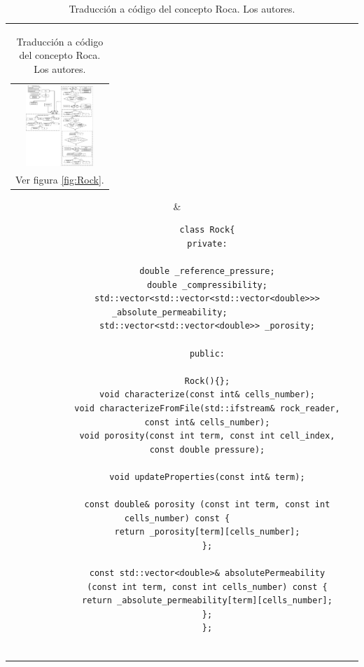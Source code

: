 \begin{table}[h]
	\centering
	\begin{tabular}{cc}
		\parbox[c]{1em}{
			\begin{tabular}[c]{@{}c@{}}\includegraphics[width=1in]{Fig/Rock.pdf}\\ Ver figura \ref{fig:Rock}.\end{tabular}
		}
		&
		\begin{tiny}
			\begin{lstlisting}
			class Rock{
			private:
			
			double _reference_pressure;
			double _compressibility;
			std::vector<std::vector<std::vector<double>>> _absolute_permeability;   
			std::vector<std::vector<double>> _porosity;
			
			public:
			
			Rock(){};
			void characterize(const int& cells_number);
			void characterizeFromFile(std::ifstream& rock_reader,
			const int& cells_number);
			void porosity(const int term, const int cell_index,
			const double pressure);
			
			void updateProperties(const int& term);
			
			const double& porosity (const int term, const int cells_number) const {
			return _porosity[term][cells_number];
			};
			
			const std::vector<double>& absolutePermeability
			(const int term, const int cells_number) const {
			return _absolute_permeability[term][cells_number];
			};
			};
			
			\end{lstlisting}
		\end{tiny}
	\end{tabular}
	\label{tab:RockCode}
	\caption[Traducción a código del concepto Roca.]{Traducción a código del concepto Roca. Los autores.}
\end{table}

